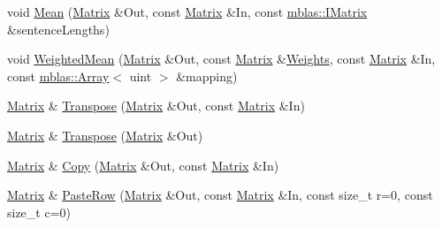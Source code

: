 \begin{DoxyCompactItemize}
\item 
void \hyperlink{namespaceamunmt_1_1GPU_1_1mblas_ae4b56d534b95189bf183d6008e2d7e45}{Mean} (\hyperlink{namespaceamunmt_1_1GPU_1_1mblas_ab67821a8254de53e45a623cf73c0aef6}{Matrix} \&Out, const \hyperlink{namespaceamunmt_1_1GPU_1_1mblas_ab67821a8254de53e45a623cf73c0aef6}{Matrix} \&In, const \hyperlink{namespaceamunmt_1_1GPU_1_1mblas_ad6a337d269d1833a6028b8871e57d2d0}{mblas\+::\+I\+Matrix} \&sentence\+Lengths)
\item 
void \hyperlink{namespaceamunmt_1_1GPU_1_1mblas_a90a5cec147d44d6774e5de8e9e0d696e}{Weighted\+Mean} (\hyperlink{namespaceamunmt_1_1GPU_1_1mblas_ab67821a8254de53e45a623cf73c0aef6}{Matrix} \&Out, const \hyperlink{namespaceamunmt_1_1GPU_1_1mblas_ab67821a8254de53e45a623cf73c0aef6}{Matrix} \&\hyperlink{structamunmt_1_1GPU_1_1Weights}{Weights}, const \hyperlink{namespaceamunmt_1_1GPU_1_1mblas_ab67821a8254de53e45a623cf73c0aef6}{Matrix} \&In, const \hyperlink{classamunmt_1_1GPU_1_1mblas_1_1Array}{mblas\+::\+Array}$<$ uint $>$ \&mapping)
\item 
\hyperlink{namespaceamunmt_1_1GPU_1_1mblas_ab67821a8254de53e45a623cf73c0aef6}{Matrix} \& \hyperlink{namespaceamunmt_1_1GPU_1_1mblas_a5b1f45cb5c05d5a9fbedab3e74553e73}{Transpose} (\hyperlink{namespaceamunmt_1_1GPU_1_1mblas_ab67821a8254de53e45a623cf73c0aef6}{Matrix} \&Out, const \hyperlink{namespaceamunmt_1_1GPU_1_1mblas_ab67821a8254de53e45a623cf73c0aef6}{Matrix} \&In)
\item 
\hyperlink{namespaceamunmt_1_1GPU_1_1mblas_ab67821a8254de53e45a623cf73c0aef6}{Matrix} \& \hyperlink{namespaceamunmt_1_1GPU_1_1mblas_a671f08d54e14b86a354517acc8d457e2}{Transpose} (\hyperlink{namespaceamunmt_1_1GPU_1_1mblas_ab67821a8254de53e45a623cf73c0aef6}{Matrix} \&Out)
\item 
\hyperlink{namespaceamunmt_1_1GPU_1_1mblas_ab67821a8254de53e45a623cf73c0aef6}{Matrix} \& \hyperlink{namespaceamunmt_1_1GPU_1_1mblas_a6359878c47a6c3703d7d8b6e9db1d87e}{Copy} (\hyperlink{namespaceamunmt_1_1GPU_1_1mblas_ab67821a8254de53e45a623cf73c0aef6}{Matrix} \&Out, const \hyperlink{namespaceamunmt_1_1GPU_1_1mblas_ab67821a8254de53e45a623cf73c0aef6}{Matrix} \&In)
\item 
\hyperlink{namespaceamunmt_1_1GPU_1_1mblas_ab67821a8254de53e45a623cf73c0aef6}{Matrix} \& \hyperlink{namespaceamunmt_1_1GPU_1_1mblas_aff338966a337172d52673594c7a31474}{Paste\+Row} (\hyperlink{namespaceamunmt_1_1GPU_1_1mblas_ab67821a8254de53e45a623cf73c0aef6}{Matrix} \&Out, const \hyperlink{namespaceamunmt_1_1GPU_1_1mblas_ab67821a8254de53e45a623cf73c0aef6}{Matrix} \&In, const size\+\_\+t r=0, const size\+\_\+t c=0)

\end{DoxyCompactItemize}
